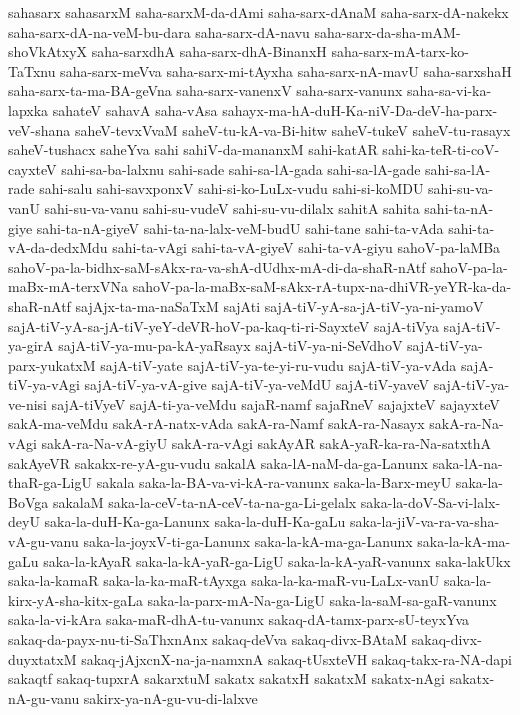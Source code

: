 {sahasarx
sahasarxM
saha-sarxM-da-dAmi
saha-sarx-dAnaM
saha-sarx-dA-nakekx
saha-sarx-dA-na-veM-bu-dara
saha-sarx-dA-navu
saha-sarx-da-sha-mAM-shoVkAtxyX
saha-sarxdhA
saha-sarx-dhA-BinanxH
saha-sarx-mA-tarx-ko-TaTxnu
saha-sarx-meVva
saha-sarx-mi-tAyxha
saha-sarx-nA-mavU
saha-sarxshaH
saha-sarx-ta-ma-BA-geVna
saha-sarx-vanenxV
saha-sarx-vanunx
saha-sa-vi-ka-lapxka
sahateV
sahavA
saha-vAsa
sahayx-ma-hA-duH-Ka-niV-Da-deV-ha-parx-veV-shana
saheV-tevxVvaM
saheV-tu-kA-va-Bi-hitw
saheV-tukeV
saheV-tu-rasayx
saheV-tushacx
saheYva
sahi
sahiV-da-mananxM
sahi-katAR
sahi-ka-teR-ti-coV-cayxteV
sahi-sa-ba-lalxnu
sahi-sade
sahi-sa-lA-gada
sahi-sa-lA-gade
sahi-sa-lA-rade
sahi-salu
sahi-savxponxV
sahi-si-ko-LuLx-vudu
sahi-si-koMDU
sahi-su-va-vanU
sahi-su-va-vanu
sahi-su-vudeV
sahi-su-vu-dilalx
sahitA
sahita
sahi-ta-nA-giye
sahi-ta-nA-giyeV
sahi-ta-na-lalx-veM-budU
sahi-tane
sahi-ta-vAda
sahi-ta-vA-da-dedxMdu
sahi-ta-vAgi
sahi-ta-vA-giyeV
sahi-ta-vA-giyu
sahoV-pa-laMBa
sahoV-pa-la-bidhx-saM-sAkx-ra-va-shA-dUdhx-mA-di-da-shaR-nAtf
sahoV-pa-la-maBx-mA-terxVNa
sahoV-pa-la-maBx-saM-sAkx-rA-tupx-na-dhiVR-yeYR-ka-da-shaR-nAtf
sajAjx-ta-ma-naSaTxM
sajAti
sajA-tiV-yA-sa-jA-tiV-ya-ni-yamoV
sajA-tiV-yA-sa-jA-tiV-yeY-deVR-hoV-pa-kaq-ti-ri-SayxteV
sajA-tiVya
sajA-tiV-ya-girA
sajA-tiV-ya-mu-pa-kA-yaRsayx
sajA-tiV-ya-ni-SeVdhoV
sajA-tiV-ya-parx-yukatxM
sajA-tiV-yate
sajA-tiV-ya-te-yi-ru-vudu
sajA-tiV-ya-vAda
sajA-tiV-ya-vAgi
sajA-tiV-ya-vA-give
sajA-tiV-ya-veMdU
sajA-tiV-yaveV
sajA-tiV-ya-ve-nisi
sajA-tiVyeV
sajA-ti-ya-veMdu
sajaR-namf
sajaRneV
sajajxteV
sajayxteV
sakA-ma-veMdu
sakA-rA-natx-vAda
sakA-ra-Namf
sakA-ra-Nasayx
sakA-ra-Na-vAgi
sakA-ra-Na-vA-giyU
sakA-ra-vAgi
sakAyAR
sakA-yaR-ka-ra-Na-satxthA
sakAyeVR
sakakx-re-yA-gu-vudu
sakalA
saka-lA-naM-da-ga-Lanunx
saka-lA-na-thaR-ga-LigU
sakala
saka-la-BA-va-vi-kA-ra-vanunx
saka-la-Barx-meyU
saka-la-BoVga
sakalaM
saka-la-ceV-ta-nA-ceV-ta-na-ga-Li-gelalx
saka-la-doV-Sa-vi-lalx-deyU
saka-la-duH-Ka-ga-Lanunx
saka-la-duH-Ka-gaLu
saka-la-jiV-va-ra-va-sha-vA-gu-vanu
saka-la-joyxV-ti-ga-Lanunx
saka-la-kA-ma-ga-Lanunx
saka-la-kA-ma-gaLu
saka-la-kAyaR
saka-la-kA-yaR-ga-LigU
saka-la-kA-yaR-vanunx
saka-lakUkx
saka-la-kamaR
saka-la-ka-maR-tAyxga
saka-la-ka-maR-vu-LaLx-vanU
saka-la-kirx-yA-sha-kitx-gaLa
saka-la-parx-mA-Na-ga-LigU
saka-la-saM-sa-gaR-vanunx
saka-la-vi-kAra
saka-maR-dhA-tu-vanunx
sakaq-dA-tamx-parx-sU-teyxYva
sakaq-da-payx-nu-ti-SaThxnAnx
sakaq-deVva
sakaq-divx-BAtaM
sakaq-divx-duyxtatxM
sakaq-jAjxcnX-na-ja-namxnA
sakaq-tUsxteVH
sakaq-takx-ra-NA-dapi
sakaqtf
sakaq-tupxrA
sakarxtuM
sakatx
sakatxH
sakatxM
sakatx-nAgi
sakatx-nA-gu-vanu
sakirx-ya-nA-gu-vu-di-lalxve
}
